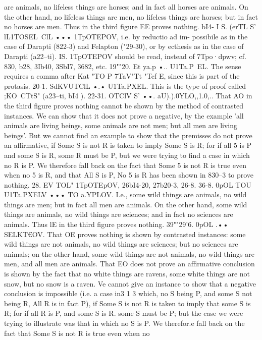 {are animals, no lifeless things are horses; and in fact all horses
are animals. On the other hand, no lifeless things are men, no
lifeless things are horses; but in fact no horses are men. Thus in
the third figure EE proves nothing.
bI4- I S. (erTL S' lL1TOSEL~ClL ••• 1TpOTEPOV, i.e. by reductio ad im-
possibile as in the case of Darapti (822-3) and Felapton ("29-30),
or by ecthesis as in the case of Darapti (a22--ti).
IS. 1TpOTEPOV should be read, instead of 7Tpo·dpwv; cf. 830, b28,
3Ib40, 3SbI7, 3682, etc.
19""20. Et ya.p •.. U1Ta.P~EL. The sense requires a comma after
Kat "TO P 7TaV"Tt "Tcf E, since this is part of the protasis.
20-1. SdKVUTClL •.• U1Ta.PXEL. This is the type of proof called
;KO~CTtS"
(a23--ti, bI4 ).
22-31. OTClV S' ••. aU).).0YLO,,1.0,.. That AO in the third figure
proves nothing cannot be shown by the method of contrasted
instances. We can show that it does not prove a negative, by
the example 'all animals are living beings, some animals are not
men; but all men are living beings'. But we cannot find an
example to show that the premisses do not prove an affirmative,
if Some S is not R is taken to imply Some S is R; for if all 5 is P
and some S is R, some R must be P, but we were trying to find
a case in which no R is P. We therefore fall back on the fact
that Some 5 is not R is true even when no 5 is R, and that All
S is P, No 5 is R has been shown in 830--3 to prove nothing.
28. EV TOL" 1TpOTEpOV, 26bI4-20, 27b20-3, 26-8.
36-8. 0pOL TOU U1Ta.PXELV ••• TO a.YPLOV. I.e., some wild things
are animals, no wild things are men; but in fact all men are
animals. On the other hand, some wild things are animals, no
wild things are sciences; and in fact no sciences are animals.
Thus lE in the third figure proves nothing.
39""29'6. 0pOL .•• SELKT€OV. That OE proves nothing is shown
by contrasted instances: some wild things are not animals, no
wild things are sciences; but no sciences are animals; on the
other hand, some wild things are not animals, no wild things are
men, and all men are animals.
That EO does not prove an affirmative conclusion is shown by
the fact that no white things are ravens, some white things are
not snow, but no snow is a raven. \-Ve cannot give an instance
to show that a negative conclusion is impossible (i.e. a case in3 1 3
which, no S being P, and some S not being R, All R is in fact P),
if Some S is not R is taken to imply that some S is R; for if all
R is P, and some S is R. some S must be P; but the case we were
trying to illustrate was that in which no S is P. We therefor.e
fall back on the fact that Some S is not R is true even when no
}

